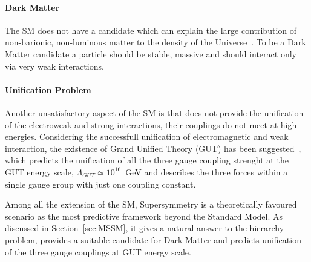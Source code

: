 \paragraph{Dark Matter}   The SM does not have a candidate which can explain the large contribution 
	of non-barionic, non-luminous matter to the density of the Universe~\cite{darkmatter1,darkmatter2,darkmatter3}. To be a Dark Matter candidate a particle should be
	stable, massive and should interact only via very weak interactions. 

\paragraph{Unification Problem}	Another unsatisfactory aspect of the SM is that does not provide the unification of the electroweak and strong interactions,
	their couplings do not meet at high energies. Considering the successfull unification of electromagnetic and weak
	interaction, the existence of Grand Unified Theory (GUT) has been 
	suggested~\cite{GUT1,GUT2}, which predicts the unification of all the three gauge coupling strenght at the GUT energy scale,
	$\Lambda_{GUT} \simeq 10^{16}$~GeV and describes the three forces within a single gauge group with just one coupling constant.

Among all the extension of the SM, Supersymmetry is a theoretically favoured scenario as the most predictive framework beyond the Standard Model.
As discussed in Section~\ref{sec:MSSM}, it gives a natural answer to the hierarchy problem, provides a suitable candidate for Dark Matter
and predicts unification of the three gauge couplings at GUT energy scale.


%
%

